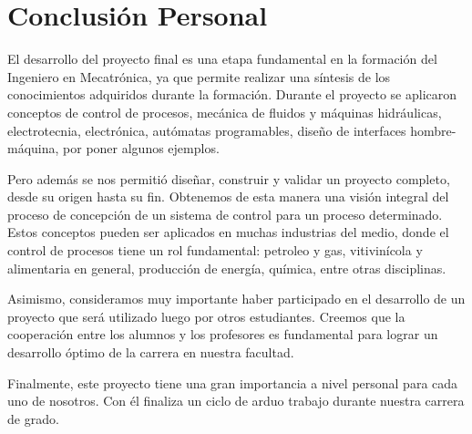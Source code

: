 \section{Conclusión Personal}
\label{sec:ConclusionPersonal}


El desarrollo del proyecto final es una etapa fundamental en la formación del
Ingeniero en Mecatrónica, ya que permite realizar una síntesis de los
conocimientos adquiridos durante la formación.
Durante el proyecto se aplicaron conceptos de control de
procesos, mecánica de fluidos y máquinas hidráulicas, electrotecnia,
electrónica, autómatas programables, diseño de interfaces hombre-máquina, por 
poner algunos ejemplos.

Pero además se nos permitió diseñar, construir y validar un proyecto completo,
desde su origen hasta su fin.
Obtenemos de esta manera una visión integral del proceso de concepción de un
sistema de control para un proceso determinado.
Estos conceptos pueden ser aplicados en muchas industrias del medio, donde el
control de procesos tiene un rol fundamental: petroleo y gas, vitivinícola y
alimentaria en general, producción de energía, química, entre otras disciplinas.

Asimismo, consideramos muy importante haber participado en el desarrollo de un
proyecto que será utilizado luego por otros estudiantes.
Creemos que la cooperación entre los alumnos y los profesores es fundamental
para lograr un desarrollo óptimo de la carrera en nuestra facultad.

Finalmente, este proyecto tiene una gran importancia a nivel personal para cada
uno de nosotros.
Con él finaliza un ciclo de arduo trabajo durante nuestra
carrera de grado.

